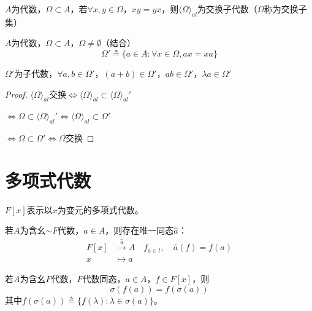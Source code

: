 \documentclass[lang=cn,a4paper,newtx,section]{elegantbook}
\begin{document}
\begin{proposition}
  $A$为代数，$\Omega \subset A$，若$\forall x, y \in \Omega$，$xy = yx$，则$\langle \Omega \rangle_{al}$为交换子代数（$\Omega$称为交换子集）
\end{proposition}

\begin{definition}[对换]
  $A$为代数，$\Omega \subset A$，$\Omega \neq \emptyset$（结合）
  \begin{equation*}
    \Omega' \triangleq \{a \in A : \forall x \in \Omega, ax = xa\}
  \end{equation*}
\end{definition}

\begin{proposition}
  $\Omega'$为子代数，$\forall a, b \in \Omega'$，$(a+b) \in \Omega'$，$ab \in \Omega'$，$\lambda a \in \Omega'$
\end{proposition}

\begin{proof}
  $\langle \Omega \rangle_{al}$交换$\Longleftrightarrow \langle \Omega \rangle_{al} \subset \langle \Omega \rangle_{al}'$
  
  $\Longleftrightarrow \Omega \subset \langle \Omega \rangle_{al}' \Longleftrightarrow \langle \Omega \rangle_{al} \subset \Omega'$
  
  $\Longleftrightarrow \Omega \subset \Omega' \Longleftrightarrow \Omega$交换
\end{proof}

\section{多项式代数}

\begin{definition}
  $F[x]$表示以$x$为变元的多项式代数。
\end{definition}

\begin{proposition}
  若$A$为含幺$\sim F$代数，$a \in A$，则存在唯一同态$\hat{a}$：
  \begin{equation*}
    \begin{aligned}
      F[x] &\xrightarrow{\hat{a}} A \quad f_{a \in t}, \quad \hat{a}(f) = f(a) \\
      x &\longmapsto a
    \end{aligned}
  \end{equation*}
\end{proposition}

\begin{theorem}[谱映射定理]
  若$A$为含幺$F$代数，$F$代数同态，$a \in A$，$f \in F[x]$，则
  \begin{equation*}
    \sigma(f(a)) = f(\sigma(a))
  \end{equation*}
  其中$f(\sigma(a)) \triangleq \{f(\lambda) : \lambda \in \sigma(a)\}$。
\end{theorem}
\end{document}
